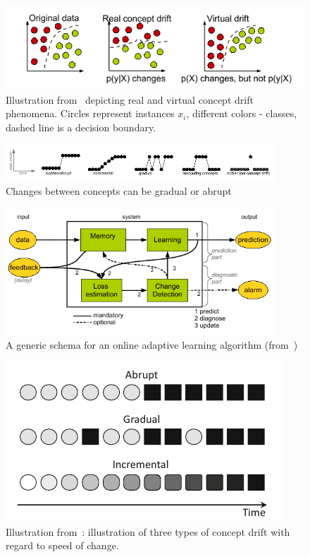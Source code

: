 \documentclass[doctoral,utf8,lot,loar,lof,shortloft,index]{jydiss}
\begin{document}
\begin{figure}[htb!]
	\centering
	\includegraphics[height=0.15\textheight]{images_cropped/gama_survey_cd_fig1}
	\caption{Illustration from~\cite{gama2014survey} depicting real and virtual concept drift phenomena. Circles represent instances $x_i$, different colors - classes, dashed line is a decision boundary. }\label{fig:fig1_gama_survey_cd}
\end{figure}

\begin{figure}[htb!]
	\centering
	\includegraphics[width=0.9\textwidth]{images_cropped/gama_survey_cd_fig2}
  \caption{Changes between concepts can be gradual or abrupt~\cite{gama2014survey}}\label{fig:fig2_gama_survey_cd}
\end{figure}

\begin{figure}[htb!]
	\centering
	\includegraphics[width=0.9\textwidth]{images_cropped/gama_survey_cd_fig3}
  \caption{A generic schema for an online adaptive learning algorithm (from~\cite{gama2014survey})}\label{fig:fig3_gama_survey_cd}
\end{figure}

\begin{figure}[htb!]
	\centering
	\includegraphics[height=0.15\textheight]{images_cropped/krop_souza_cd_speed}
	\caption{Illustration from~\cite{SouzaChallenges2020}: illustration of three types of concept drift with regard to speed of change.}\label{fig:souza_cd_speeds}
\end{figure}
\end{document}
